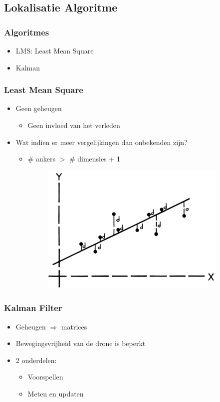 \documentclass{beamer}
\begin{document}
\subsection{Lokalisatie Algoritme}
  \begin{frame}
    \frametitle{Algoritmes}
    \begin{itemize}
      \item LMS: Least Mean Square
      \item Kalman 
    \end{itemize}
  \end{frame}
  \begin{frame}
    \frametitle{Least Mean Square}
    \begin{itemize}
      \item Geen geheugen
        \begin{itemize}
          \item Geen invloed van het verleden
        \end{itemize}
      \item Wat indien er meer vergelijkingen dan onbekenden zijn?
        \begin{itemize}
          \item \# ankers $>$ \# dimensies + 1
          \begin{figure}
            \begin{center}
              \includegraphics[width=.5\textwidth]{images/LMS.jpg}
            \end{center}
          \end{figure}
        \end{itemize}
    \end{itemize}
  \end{frame}
  \begin{frame}
    \frametitle{Kalman Filter}
    \begin{itemize}
      \item Geheugen $\Rightarrow$ matrices
      \item Bewegingsvrijheid van de drone is beperkt
      \item 2 onderdelen:
        \begin{itemize}
          \item Voorspellen
          \item Meten en updaten
        \end{itemize}
    \end{itemize}
  \end{frame}
\end{document}
